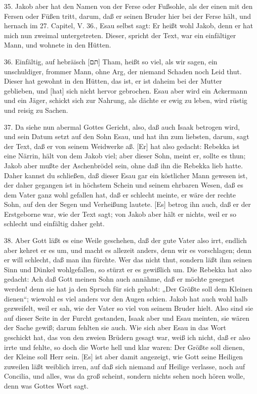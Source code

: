 35. Jakob aber hat den Namen von der Ferse oder Fußsohle, als der einen mit den Fersen oder Füßen tritt, darum, daß er seinen Bruder hier bei der Ferse hält, und hernach im 27. Capitel, V. 36., Esau selbst sagt: Er heißt wohl Jakob, denn er hat mich nun zweimal untergetreten. Dieser, spricht der Text, war ein einfältiger Mann, und wohnete in den Hütten.

36. Einfältig, auf hebräisch [תם] Tham, heißt so viel, als wir sagen, ein unschuldiger, frommer Mann, ohne Arg, der niemand Schaden noch Leid thut. Dieser hat gewohnt in den Hütten, das ist, er ist daheim bei der Mutter geblieben, und [hat] sich nicht hervor gebrochen. Esau aber wird ein Ackermann und ein Jäger, schickt sich zur Nahrung, als dächte er ewig zu leben, wird rüstig und reisig zu Sachen.

37. Da siehe nun abermal Gottes Gericht, also, daß auch Isaak betrogen wird, und sein Datum setzt auf den Sohn Esau, und hat ihn zum liebsten, darum, sagt der Text, daß er von seinem Weidwerke aß. [Er] hat also gedacht: Rebekka ist eine Närrin, hält von dem Jakob viel; aber dieser Sohn, meint er, sollte es thun; Jakob aber mußte der Aschenbrödel sein, ohne daß ihn die Rebekka lieb hatte. Daher kannst du schließen, daß dieser Esau gar ein köstlicher Mann gewesen ist, der daher gegangen ist in höchstem Schein und seinem ehrbaren Wesen, daß es dem Vater ganz wohl gefallen hat, daß er schlecht meinte, er wäre der rechte Sohn, auf den der Segen und Verheißung lautete. [Es] betrog ihn auch, daß er der Erstgeborne war, wie der Text sagt; von Jakob aber hält er nichts, weil er so schlecht und einfältig daher geht.

38. Aber Gott läßt es eine Weile geschehen, daß der gute Vater also irrt, endlich aber kehret er es um, und macht es allezeit anders, denn wir es vorschlagen; denn er will schlecht, daß man ihn fürchte. Wer das nicht thut, sondern läßt ihm seinen Sinn und Dünkel wohlgefallen, so stürzt er es gewißlich um. Die Rebekka hat also gedacht: Ach daß Gott meinen Sohn auch annähme, daß er möchte gesegnet werden! denn sie hat ja den Spruch für sich gehabt: „Der Größte soll dem Kleinen dienen“; wiewohl es viel anders vor den Augen schien. Jakob hat auch wohl halb gezweifelt, weil er sah, wie der Vater so viel von seinem Bruder hielt. Also sind sie auf dieser Seite in der Furcht gestanden, Isaak aber und Esau meinten, sie wären der Sache gewiß; darum fehlten sie auch. Wie sich aber Esau in das Wort geschickt hat, das von den zweien Brüdern gesagt war, weiß ich nicht, daß er also irrte und fehlte, so doch die Worte hell und klar waren: Der Größte soll dienen, der Kleine soll Herr sein. [Es] ist aber damit angezeigt, wie Gott seine Heiligen zuweilen läßt weiblich irren, auf daß sich niemand auf Heilige verlasse, noch auf Concilia, und alles, was da groß scheint, sondern nichts sehen noch hören wolle, denn was Gottes Wort sagt.

